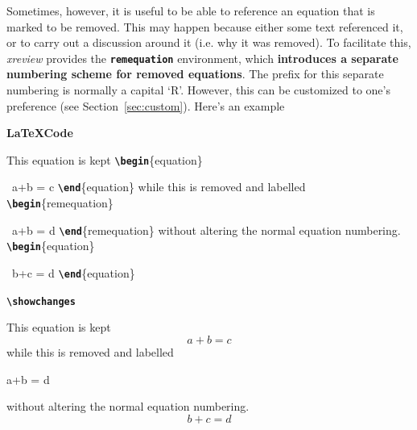 \documentclass[a4paper]{ltxdoc}
\newcommand{\writecommand}[1]{\texttt{\textbf{{\textbackslash#1}}}}
\newcommand{\writeenv}[1]{\texttt{\textbf{{#1}}}}
\newcommand{\writearg}[1]{\{#1\}}
\begin{document}
Sometimes, however, it is useful to be able to reference an equation that is marked to be removed. This may happen because either some text referenced it, or to carry out a discussion around it (i.e. why it was removed).
To facilitate this, \textit{xreview} provides the \writeenv{remequation} environment, which \textbf{introduces a separate numbering scheme for removed equations}. 
The prefix for this separate numbering is normally a capital `R'. However, this can be customized to one's preference (see Section~\ref{sec:custom}).
Here's an example

\begin{center}
    \begin{minipage}[t]{0.3\linewidth}
    \textbf{\LaTeX Code}
    
    This equation is kept \newline
    \writecommand{begin}\writearg{equation}

    ~\quad a+b = c\newline
    \writecommand{end}\writearg{equation}\newline
    while this is removed and labelled\newline
    \writecommand{begin}\writearg{remequation}

    ~\quad a+b = d\newline
    \writecommand{end}\writearg{remequation}\newline
    without altering the normal equation numbering.\newline
    \writecommand{begin}\writearg{equation}

    ~\quad b+c = d\newline
    \writecommand{end}\writearg{equation}\newline

    \end{minipage}
    \hfill
    \begin{minipage}[t]{0.3\linewidth}
    \writecommand{showchanges}
    \showchanges
    
    This equation is kept
    \begin{equation}
        a+b = c
    \end{equation}
    while this is removed and labelled
    \begin{remequation}
        a+b = d
        \label{eq:remeq_example}
    \end{remequation}
    \makeatletter
    \addtocounter{xreview@removedeqcounter}{-1}
    \makeatother
    without altering the normal equation numbering.
    \begin{equation}
        b+c = d
    \end{equation}\addtocounter{equation}{-2}


\end{minipage}
\end{center}
\end{document}

